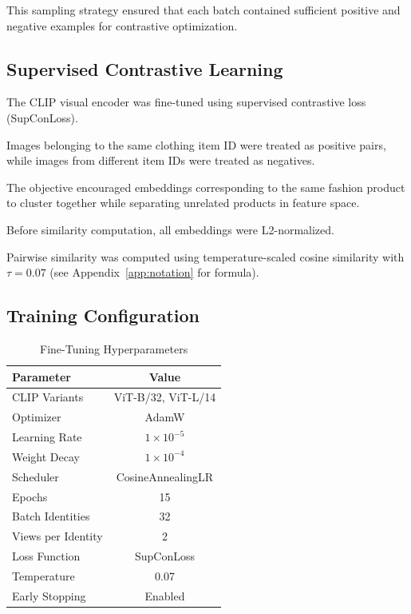 \documentclass[11pt,a4paper]{article}
\begin{document}
This sampling strategy ensured that each batch contained sufficient positive and negative examples for contrastive optimization.

\subsection{Supervised Contrastive Learning}

The CLIP visual encoder was fine-tuned using supervised contrastive loss (SupConLoss).

Images belonging to the same clothing item ID were treated as positive pairs, while images from different item IDs were treated as negatives.

The objective encouraged embeddings corresponding to the same fashion product to cluster together while separating unrelated products in feature space.

Before similarity computation, all embeddings were L2-normalized.

Pairwise similarity was computed using temperature-scaled cosine similarity with $\tau = 0.07$ (see Appendix~\ref{app:notation} for formula).

\subsection{Training Configuration}

\begin{table}[H]
\centering
\caption{Fine-Tuning Hyperparameters}
\begin{tabular}{lc}
\toprule
Parameter & Value \\
\midrule
CLIP Variants & ViT-B/32, ViT-L/14 \\
Optimizer & AdamW \\
Learning Rate & $1 \times 10^{-5}$ \\
Weight Decay & $1 \times 10^{-4}$ \\
Scheduler & CosineAnnealingLR \\
Epochs & 15 \\
Batch Identities & 32 \\
Views per Identity & 2 \\
Loss Function & SupConLoss \\
Temperature & 0.07 \\
Early Stopping & Enabled \\
\bottomrule
\end{tabular}
\end{table}
\end{document}
